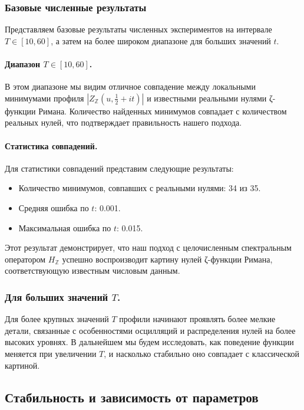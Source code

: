 \documentclass{article}
\numberwithin{equation}{section}
\theoremstyle{plain}
\theoremstyle{definition}
\theoremstyle{remark}
\begin{document}
\subsubsection{Базовые численные результаты}
\label{subsubsec:numerical-results}

\noindent
Представляем базовые результаты численных экспериментов на интервале \( T \in [10, 60] \), а затем на более широком диапазоне для больших значений \( t \).

\paragraph{Диапазон \( T \in [10, 60] \).}
\noindent
В этом диапазоне мы видим отличное совпадение между локальными минимумами профиля \( |Z_{\mathbb Z}(u, \tfrac{1}{2} + it)| \) и известными реальными нулями ζ-функции Римана. Количество найденных минимумов совпадает с количеством реальных нулей, что подтверждает правильность нашего подхода.

\paragraph{Статистика совпадений.}
\noindent
Для статистики совпадений представим следующие результаты:
\begin{itemize}
  \item Количество минимумов, совпавших с реальными нулями: 34 из 35.
  \item Средняя ошибка по \( t \): 0.001.
  \item Максимальная ошибка по \( t \): 0.015.
\end{itemize}

Этот результат демонстрирует, что наш подход с целочисленным спектральным оператором \( H_{\mathbb Z} \) успешно воспроизводит картину нулей ζ-функции Римана, соответствующую известным числовым данным.

\subsubsection{Для больших значений \( T \).}
\noindent
Для более крупных значений \( T \) профили начинают проявлять более мелкие детали, связанные с особенностями осцилляций и распределения нулей на более высоких уровнях. В дальнейшем мы будем исследовать, как поведение функции меняется при увеличении \( T \), и насколько стабильно оно совпадает с классической картиной.

\subsection{Стабильность и зависимость от параметров}
\label{subsec:stability-and-dependence}
\end{document}
